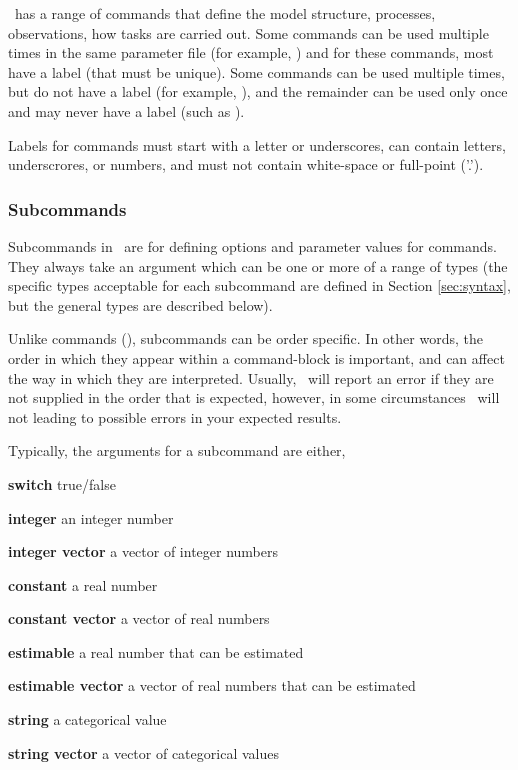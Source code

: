 \SPM\ has a range of commands that define the model structure, processes, observations, how tasks are carried out. Some commands can be used multiple times in the same parameter file (for example, ) and for these commands, most have a label (that must be unique). Some commands can be used multiple times, but do not have a label (for example, ), and the remainder can be used only once and may never have a label (such as ). 

Labels for commands must start with a letter or underscores, can contain letters, underscrores, or numbers, and must not contain white-space or full-point ('.').

\subsubsection{Subcommands}

Subcommands in \SPM\ are for defining options and parameter values for commands. They always take an argument which can be one or more of a range of types (the specific types acceptable for each subcommand are defined in Section \ref{sec:syntax}, but the general types are described below). 

Unlike commands (), subcommands can be order specific. In other words, the order in which they appear within a command-block is important, and can affect the way in which they are interpreted. Usually, \SPM\ will report an error if they are not supplied in the order that is expected, however, in some circumstances \SPM\ will not \textemdash leading to possible errors in your expected results.  

Typically, the arguments for a subcommand are either,

\begin{description}
\item \textbf{switch} true/false 
\item \textbf{integer} an integer number
\item \textbf{integer vector} a vector of integer numbers
\item \textbf{constant} a real number 
\item \textbf{constant vector} a vector of real numbers
\item \textbf{estimable} a real number that can be estimated
\item \textbf{estimable vector} a vector of real numbers that can be estimated
\item \textbf{string} a categorical value
\item \textbf{string vector} a vector of categorical values
\end{description}

